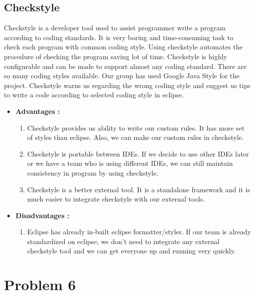 \documentclass[a4paper,11pt]{report}
\begin{document}
 \subsection{Checkstyle}
 Checkstyle is a developer tool used to assist programmer write a program according to coding standards. It is very boring and time-consuming task to check each program with common coding style. Using checkstyle automates the procedure of checking the program saving lot of time. Checkstyle is highly configurable and can be made to support almost any coding standard. There are so many coding styles available. Our group has used Google Java Style for the project. Checkstyle warns us regarding the wrong coding style and suggest us tips to write a code according to selected coding style in eclipse.\\
 \begin{itemize}
     \item \textbf{Advantages : }
     \begin{enumerate}
         \item Checkstyle provides us ability to write our custom rules. It has more set of styles than eclipse. Also, we can make our custom rules in checkstyle.\\
         \item Checkstyle is portable between IDEs. If we decide to use other IDEs later or we have a team who is using different IDEs, we can still maintain consistency in program by using checkstyle.\\
         \item Checkstyle is a better external tool. It is a standalone framework and it is much easier to integrate checkstyle with our external tools.\\
     \end{enumerate}
     \item \textbf{Disadvantages : }
     \begin{enumerate}
         \item Eclipse has already in-built eclipse formatter/styler. If our team is already standardized on eclipse, we don’t need to integrate any external checkstyle tool and we can get everyone up and running very quickly.\\
     \end{enumerate}
     
 \end{itemize}
 \newpage
 \section{Problem 6}
\end{document}
